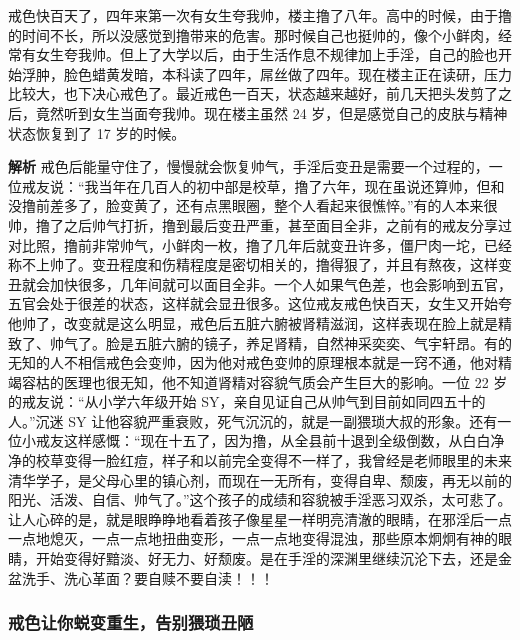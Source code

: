 \begin{case}
    戒色快百天了，四年来第一次有女生夸我帅，楼主撸了八年。高中的时候，由于撸的时间不长，所以没感觉到撸带来的危害。那时候自己也挺帅的，像个小鲜肉，经常有女生夸我帅。但上了大学以后，由于生活作息不规律加上手淫，自己的脸也开始浮肿，脸色蜡黄发暗，本科读了四年，屌丝做了四年。现在楼主正在读研，压力比较大，也下决心戒色了。最近戒色一百天，状态越来越好，前几天把头发剪了之后，竟然听到女生当面夸我帅。现在楼主虽然 24 岁，但是感觉自己的皮肤与精神状态恢复到了 17 岁的时候。

    \textbf{解析} 戒色后能量守住了，慢慢就会恢复帅气，手淫后变丑是需要一个过程的，一位戒友说：“我当年在几百人的初中部是校草，撸了六年，现在虽说还算帅，但和没撸前差多了，脸变黄了，还有点黑眼圈，整个人看起来很憔悴。”有的人本来很帅，撸了之后帅气打折，撸到最后变丑严重，甚至面目全非，之前有的戒友分享过对比照，撸前非常帅气，小鲜肉一枚，撸了几年后就变丑许多，僵尸肉一坨，已经称不上帅了。变丑程度和伤精程度是密切相关的，撸得狠了，并且有熬夜，这样变丑就会加快很多，几年间就可以面目全非。一个人如果气色差，也会影响到五官，五官会处于很差的状态，这样就会显丑很多。这位戒友戒色快百天，女生又开始夸他帅了，改变就是这么明显，戒色后五脏六腑被肾精滋润，这样表现在脸上就是精致了、帅气了。脸是五脏六腑的镜子，养足肾精，自然神采奕奕、气宇轩昂。有的无知的人不相信戒色会变帅，因为他对戒色变帅的原理根本就是一窍不通，他对精竭容枯的医理也很无知，他不知道肾精对容貌气质会产生巨大的影响。一位 22 岁的戒友说：“从小学六年级开始 SY，亲自见证自己从帅气到目前如同四五十的人。”沉迷 SY 让他容貌严重衰败，死气沉沉的，就是一副猥琐大叔的形象。还有一位小戒友这样感慨：“现在十五了，因为撸，从全县前十退到全级倒数，从白白净净的校草变得一脸红痘，样子和以前完全变得不一样了，我曾经是老师眼里的未来清华学子，是父母心里的镇心剂，而现在一无所有，变得自卑、颓废，再无以前的阳光、活泼、自信、帅气了。”这个孩子的成绩和容貌被手淫恶习双杀，太可悲了。让人心碎的是，就是眼睁睁地看着孩子像星星一样明亮清澈的眼睛，在邪淫后一点一点地熄灭，一点一点地扭曲变形，一点一点地变得混浊，那些原本炯炯有神的眼睛，开始变得好黯淡、好无力、好颓废。是在手淫的深渊里继续沉沦下去，还是金盆洗手、洗心革面？要自赎不要自渎！！！
\end{case}

\subsubsection{戒色让你蜕变重生，告别猥琐丑陋}

